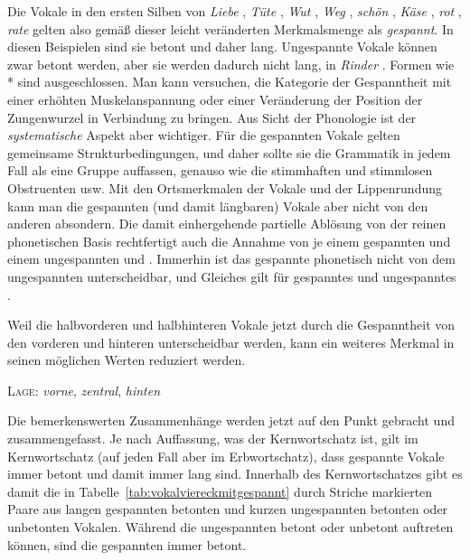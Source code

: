 Die Vokale in den ersten Silben von \textit{Liebe} \textipa{[li:b@]}, \textit{Tüte} \textipa{[ty:t@]}, \textit{Wut} \textipa{[vu:t]}, \textit{Weg} \textipa{[ve:k]}, \textit{schön} \textipa{[S\o:n]}, \textit{Käse} \textipa{[kE:z@]}, \textit{rot} \textipa{[ro:t]}, \textit{rate} \textipa{[Ka:t@]} gelten also gemäß dieser leicht veränderten Merkmalsmenge als \textit{gespannt}.
In diesen Beispielen sind sie betont und daher lang.
Ungespannte Vokale können zwar betont werden, aber sie werden dadurch nicht lang, \zB in \textit{Rinder} \textipa{[KInd5]}.
Formen wie *\textipa{[KI:nd5]} sind ausgeschlossen.
Man kann versuchen, die Kategorie der Gespanntheit mit einer erhöhten Muskelanspannung oder einer Veränderung der Position der Zungenwurzel in Verbindung zu bringen.
Aus Sicht der Phonologie ist der \textit{systematische} Aspekt aber wichtiger.
Für die gespannten Vokale gelten gemeinsame Strukturbedingungen, und daher sollte sie die Grammatik in jedem Fall als eine Gruppe auffassen, genauso wie die stimmhaften und stimmlosen Obstruenten usw.
Mit den Ortsmerkmalen der Vokale und der Lippenrundung kann man die gespannten (und damit längbaren) Vokale aber nicht von den anderen absondern. 
Die damit einhergehende partielle Ablösung von der reinen phonetischen Basis rechtfertigt auch die Annahme von je einem gespannten und einem ungespannten \textipa{[a]} und \textipa{[E]}.
Immerhin ist das gespannte \textipa{[a]} phonetisch nicht von dem ungespannten \textipa{[a]} unterscheidbar, und Gleiches gilt für gespanntes und ungespanntes \textipa{[E]}.

Weil die halbvorderen und halbhinteren Vokale jetzt durch die Gespanntheit von den vorderen und hinteren unterscheidbar werden, kann ein weiteres Merkmal in seinen möglichen Werten reduziert werden.

\begin{exe}
  \ex \textsc{Lage}: \textit{vorne}, \textit{zentral}, \textit{hinten}
\end{exe}

Die bemerkenswerten Zusammenhänge werden jetzt auf den Punkt gebracht und zusammengefasst.
Je nach Auffassung, was der Kernwortschatz ist, gilt im Kernwortschatz (auf jeden Fall aber im Erbwortschatz), dass gespannte Vokale immer betont und damit immer lang sind.
Innerhalb des Kernwortschatzes gibt es damit die in Tabelle~\ref{tab:vokalviereckmitgespannt} durch Striche markierten Paare aus langen gespannten betonten und kurzen ungespannten betonten oder unbetonten Vokalen.
Während die ungespannten betont oder unbetont auftreten können, sind die gespannten immer betont.

